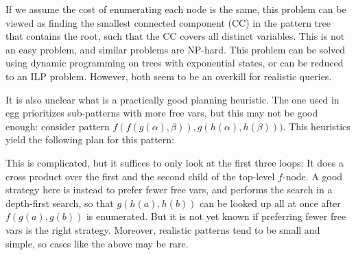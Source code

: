 If we assume the cost of enumerating each node is the same,
 this problem can be viewed as finding the smallest connected component (CC) in the
 pattern tree that contains the root, such that the CC covers all
 distinct variables.
This is not an easy problem, and similar problems are NP-hard.
This problem can be solved 
 using dynamic programming on trees with exponential states, or can be reduced
 to an ILP problem.
However, both seem to be an overkill for realistic queries.

It is also unclear what is a practically good planning heuristic.
The one used in egg prioritizes sub-patterns with more free vars,
 but this may not be good enough: 
 consider pattern
 \(f(f(g(\alpha),\beta)),g(h(\alpha), h(\beta)))\).
 This heuristics yield the following plan for this pattern:

\begin{Shaded}
\begin{Highlighting}[]
\OperatorTok{=}
          \OperatorTok{!=}
\OperatorTok{=}
            \OperatorTok{!=}
\end{Highlighting}
\end{Shaded}

This is complicated, but it suffices to only look at the first three loops: 
 It does a cross product over the first and the second child of
 the top-level \(f\)-node.
A good strategy here is instead to prefer
 fewer free vars, and performs the search in a depth-first search, 
 so that \(g(h(a), h(b))\) can be looked up all at once after
 \(f(g(a), g(b))\) is enumerated.
But it is not yet known if preferring fewer free vars is the
 right strategy.
Moreover, realistic patterns
 tend to be small and simple, 
 so cases like the above may be rare.

